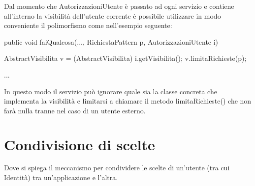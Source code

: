Dal momento che AutorizzazioniUtente è passato ad ogni servizio e contiene all'interno la visibilità dell'utente corrente  è possibile utilizzare in modo conveniente il polimorfismo come nell'esempio seguente:

\begin{java}
public void faiQualcosa(..., RichiestaPattern p, AutorizzazioniUtente i)
{
   AbstractVisibilita v = (AbstractVisibilita) i.getVisibilita();         v.limitaRichieste(p);

  ... 
}

\end{java}

In questo modo il servizio può ignorare quale sia la classe concreta che implementa la visibilità e limitarsi a chiamare il metodo limitaRichieste() che non farà nulla tranne nel caso di un utente esterno.


\section{Condivisione di scelte}
Dove si spiega il meccanismo per condividere le scelte di un'utente (tra cui Identità) tra un'applicazione e l'altra.